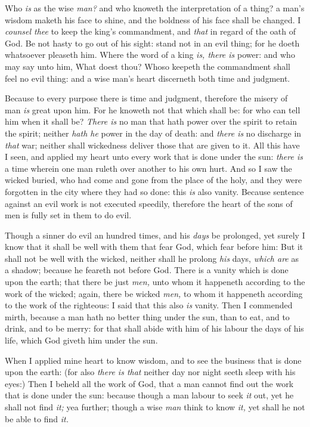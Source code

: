 \documentclass[11pt,letterpaper,oneside]{memoir}
\begin{document}
Who \emph{is} as the wise \emph{man?} and who knoweth the interpretation 
of a thing? a man's wisdom maketh his face to shine, and the boldness of 
his face shall be changed. I \emph{counsel thee} to keep the king's 
commandment, and \emph{that} in regard of the oath of God. Be not hasty 
to go out of his sight: stand not in an evil thing; for he doeth 
whatsoever pleaseth him. Where the word of a king \emph{is, there is} 
power: and who may say unto him, What doest thou? Whoso keepeth the 
commandment shall feel no evil thing: and a wise man's heart discerneth 
both time and judgment. 

Because to every purpose there is time and judgment, therefore the 
misery of man \emph{is} great upon him. For he knoweth not that which 
shall be: for who can tell him when it shall be? \emph{There is} no man 
that hath power over the spirit to retain the spirit; neither \emph{hath 
he} power in the day of death: and \emph{there is} no discharge in 
\emph{that} war; neither shall wickedness deliver those that are given 
to it. All this have I seen, and applied my heart unto every work that 
is done under the sun: \emph{there is} a time wherein one man ruleth 
over another to his own hurt. And so I saw the wicked buried, who had 
come and gone from the place of the holy, and they were forgotten in the 
city where they had so done: this \emph{is} also vanity. Because 
sentence against an evil work is not executed speedily, therefore the 
heart of the sons of men is fully set in them to do evil. 

Though a sinner do evil an hundred times, and his \emph{days} be 
prolonged, yet surely I know that it shall be well with them that fear 
God, which fear before him: But it shall not be well with the wicked, 
neither shall he prolong \emph{his} days, \emph{which are} as a shadow; 
because he feareth not before God. There is a vanity which is done upon 
the earth; that there be just \emph{men,} unto whom it happeneth 
according to the work of the wicked; again, there be wicked \emph{men,} 
to whom it happeneth according to the work of the righteous: I said that 
this also \emph{is} vanity. Then I commended mirth, because a man hath 
no better thing under the sun, than to eat, and to drink, and to be 
merry: for that shall abide with him of his labour the days of his life, 
which God giveth him under the sun. 

When I applied mine heart to know wisdom, and to see the business that 
is done upon the earth: (for also \emph{there is that} neither day nor 
night seeth sleep with his eyes:) Then I beheld all the work of God, 
that a man cannot find out the work that is done under the sun: because 
though a man labour to seek \emph{it} out, yet he shall not find 
\emph{it;} yea further; though a wise \emph{man} think to know 
\emph{it,} yet shall he not be able to find \emph{it.} 
\end{document}
